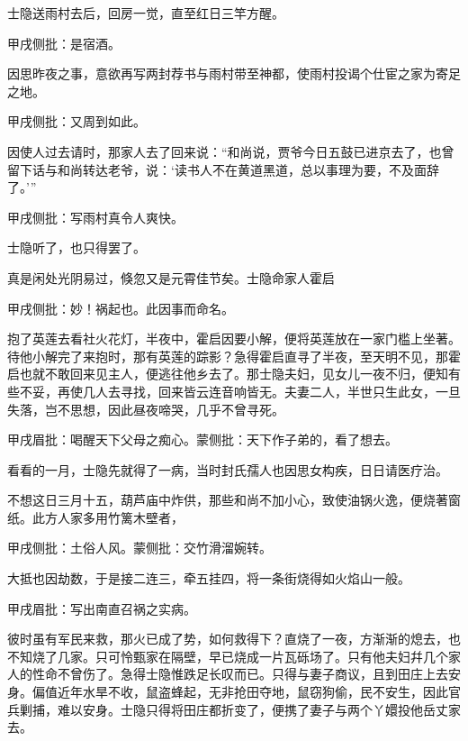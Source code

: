 \begin{parag}
    士隐送雨村去后，回房一觉，直至红日三竿方醒。\begin{note}甲戌侧批：是宿酒。\end{note}因思昨夜之事，意欲再写两封荐书与雨村带至神都，使雨村投谒个仕宦之家为寄足之地。\begin{note}甲戌侧批：又周到如此。\end{note}因使人过去请时，那家人去了回来说：“和尚说，贾爷今日五鼓已进京去了，也曾留下话与和尚转达老爷，说：‘读书人不在黄道黑道，总以事理为要，不及面辞了。’”\begin{note}甲戌侧批：写雨村真令人爽快。\end{note}士隐听了，也只得罢了。
\end{parag}


\begin{parag}
    真是闲处光阴易过，倏忽又是元霄佳节矣。士隐命家人霍启\begin{note}甲戌侧批：妙！祸起也。此因事而命名。\end{note}抱了英莲去看社火花灯，半夜中，霍启因要小解，便将英莲放在一家门槛上坐著。待他小解完了来抱时，那有英莲的踪影？急得霍启直寻了半夜，至天明不见，那霍启也就不敢回来见主人，便逃往他乡去了。那士隐夫妇，见女儿一夜不归，便知有些不妥，再使几人去寻找，回来皆云连音响皆无。夫妻二人，半世只生此女，一旦失落，岂不思想，因此昼夜啼哭，几乎不曾寻死。\begin{note}甲戌眉批：喝醒天下父母之痴心。蒙侧批：天下作子弟的，看了想去。\end{note}看看的一月，士隐先就得了一病，当时封氏孺人也因思女构疾，日日请医疗治。
\end{parag}


\begin{parag}
    不想这日三月十五，葫芦庙中炸供，那些和尚不加小心，致使油锅火逸，便烧著窗纸。此方人家多用竹篱木壁者，\begin{note}甲戌侧批：土俗人风。蒙侧批：交竹滑溜婉转。\end{note}大抵也因劫数，于是接二连三，牵五挂四，将一条街烧得如火焰山一般。\begin{note}甲戌眉批：写出南直召祸之实病。\end{note}彼时虽有军民来救，那火已成了势，如何救得下？直烧了一夜，方渐渐的熄去，也不知烧了几家。只可怜甄家在隔壁，早已烧成一片瓦砾场了。只有他夫妇幷几个家人的性命不曾伤了。急得士隐惟跌足长叹而已。只得与妻子商议，且到田庄上去安身。偏值近年水旱不收，鼠盗蜂起，无非抢田夺地，鼠窃狗偷，民不安生，因此官兵剿捕，难以安身。士隐只得将田庄都折变了，便携了妻子与两个丫嬛投他岳丈家去。
\end{parag}


